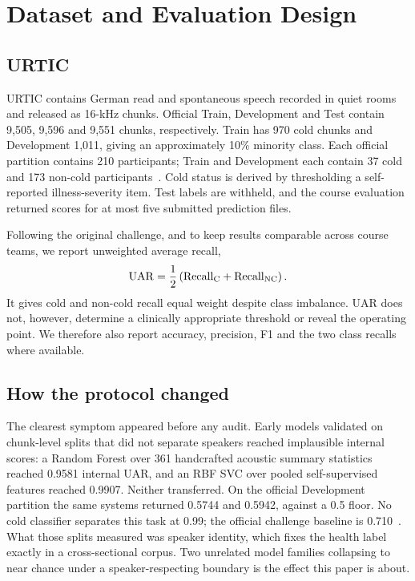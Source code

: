 \section{Dataset and Evaluation Design}
\label{sec:data_eval}

\subsection{URTIC}

URTIC contains German read and spontaneous speech recorded in quiet rooms and
released as 16-kHz chunks. Official Train, Development and Test contain 9,505,
9,596 and 9,551 chunks, respectively. Train has 970 cold chunks and
Development 1,011, giving an approximately 10\% minority class. Each official
partition contains 210 participants; Train and Development each contain 37
cold and 173 non-cold participants~\cite{schuller2017interspeech}. Cold status
is derived by thresholding a self-reported illness-severity item. Test labels
are withheld, and the course evaluation returned scores for at most five
submitted prediction files.

Following the original challenge, and to keep results comparable across
course teams, we report unweighted average recall,
\begin{equation}
 \mathrm{UAR}=\frac{1}{2}\left(
 \mathrm{Recall}_{\mathrm{C}}+\mathrm{Recall}_{\mathrm{NC}}\right).
 \label{eq:uar}
\end{equation}
It gives cold and non-cold recall equal weight despite class imbalance. UAR
does not, however, determine a clinically appropriate threshold or reveal the
operating point. We therefore also report accuracy, precision, F1 and the two
class recalls where available.

\subsection{How the protocol changed}

The clearest symptom appeared before any audit. Early models validated on
chunk-level splits that did not separate speakers reached implausible internal
scores: a Random Forest over 361 handcrafted acoustic summary statistics
reached 0.9581 internal UAR, and an RBF SVC over pooled self-supervised
features reached 0.9907. Neither transferred. On the official Development
partition the same systems returned 0.5744 and 0.5942, against a 0.5 floor.
No cold classifier separates this task at 0.99; the official challenge
baseline is 0.710~\cite{schuller2017interspeech}. What those splits measured
was speaker identity, which fixes the health label exactly in a
cross-sectional corpus. Two unrelated model families collapsing to near chance
under a speaker-respecting boundary is the effect this paper is about.

